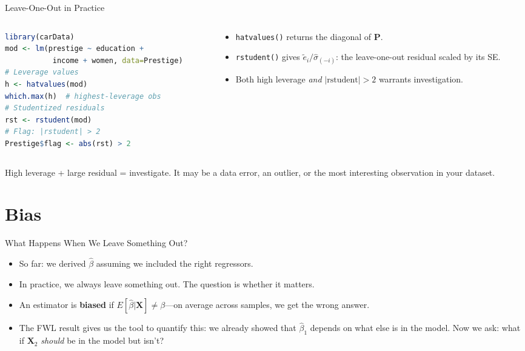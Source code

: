 \documentclass[aspectratio=169, handout, t]{beamer}
\numberwithin{equation}{section}
\begin{document}
\begin{frame}[fragile]{Leave-One-Out in Practice}
\begin{columns}[T]
\begin{column}{0.55\textwidth}
\begin{lstlisting}[language=R, basicstyle=\ttfamily\scriptsize, numbers=none]
library(carData)
mod <- lm(prestige ~ education +
           income + women, data=Prestige)
# Leverage values
h <- hatvalues(mod)
which.max(h)  # highest-leverage obs
# Studentized residuals
rst <- rstudent(mod)
# Flag: |rstudent| > 2
Prestige$flag <- abs(rst) > 2
\end{lstlisting}
\end{column}
\begin{column}{0.4\textwidth}
\begin{itemize}\setlength{\itemsep}{2pt}
\item \texttt{hatvalues()} returns the diagonal of $\bm{P}$.\pause
\item \texttt{rstudent()} gives $\tilde{e}_i/\hat{\sigma}_{(-i)}$: the leave-one-out residual scaled by its SE.\pause
\item Both high leverage \emph{and} $|\text{rstudent}|>2$ warrants investigation.
\end{itemize}
\end{column}
\end{columns}
\smallskip
\begin{tcolorbox}[colback=blue!5, colframe=blue!50, boxsep=2pt, top=2pt, bottom=2pt]
High leverage + large residual = investigate. It may be a data error, an outlier, or the most interesting observation in your dataset.
\end{tcolorbox}
\end{frame}



\section{Bias}


\begin{frame}{What Happens When We Leave Something Out?}
\begin{itemize}
\item So far: we derived $\hat{\beta}$ assuming we included the right regressors.\pause
\item In practice, we always leave something out. The question is whether it matters.\pause
\item An estimator is \textbf{biased} if $E[\hat{\beta}|\bm{X}]\neq\beta$---on average across samples, we get the wrong answer.\pause
\item The FWL result gives us the tool to quantify this: we already showed that $\hat{\beta}_1$ depends on what else is in the model. Now we ask: what if $\bm{X}_2$ \emph{should} be in the model but isn't?
\end{itemize}
\end{frame}
\end{document}
